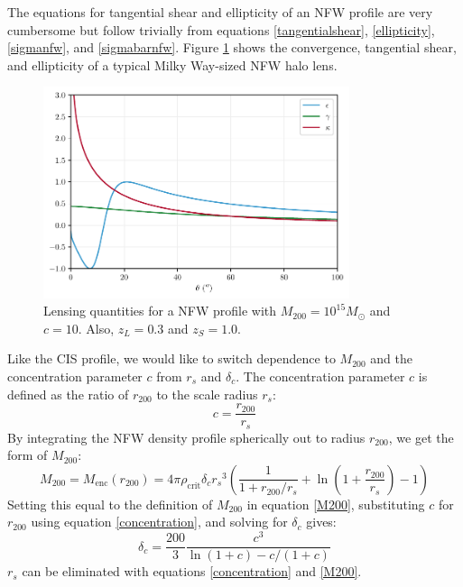 \documentclass[10pt]{article}
\begin{document}
The equations for tangential shear and ellipticity of an NFW profile are very cumbersome but follow trivially from equations \ref{tangentialshear}, \ref{ellipticity}, \ref{sigmanfw}, and \ref{sigmabarnfw}. Figure \ref{nfwproperties} shows the convergence, tangential shear, and ellipticity of a typical Milky Way-sized NFW halo lens.

\begin{figure}
    \centering
    \includegraphics[width=0.8\textwidth]{nfwproperties.pdf}
    \caption{Lensing quantities for a NFW profile with $M_{200} = 10^{15} M_\odot$ and $c = 10$. Also,  $z_L = 0.3$ and $z_S = 1.0$.}
    \label{nfwproperties}
\end{figure}

Like the CIS profile, we would like to switch dependence to $M_{200}$ and the concentration parameter $c$ from $r_s$ and $\delta_c$. The concentration parameter $c$ is defined as the ratio of $r_{200}$ to the scale radius $r_s$:
\begin{equation} \label{concentration}
c = \frac{r_{200}}{r_s}
\end{equation}
By integrating the NFW density profile spherically out to radius $r_{200}$, we get the form of $M_{200}$:
\begin{equation} \label{nfwM200}
M_{200} = M_\mathrm{enc}(r_{200}) = 4 \pi \rho_\mathrm{crit} \delta_c {r_s}^3 \left( \frac{1}{1 + r_{200}/r_s} + \ln{\left(1 + \frac{r_{200}}{r_s} \right)} - 1 \right)
\end{equation}
Setting this equal to the definition of $M_{200}$ in equation \ref{M200}, substituting $c$ for $r_{200}$ using equation \ref{concentration}, and solving for $\delta_c$ gives:
\begin{equation}
\delta_c = \frac{200}{3} \frac{c^3}{\ln(1 + c) - c/(1 + c)}
\end{equation}
$r_s$ can be eliminated with equations \ref{concentration} and \ref{M200}.
\end{document}
